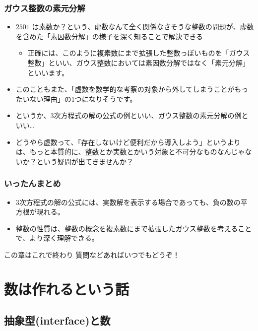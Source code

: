 \documentclass[dvipdfmx]{beamer}
\begin{document}
  \begin{frame}
    \frametitle{ガウス整数の素元分解}
  
    \begin{itemize}
      \item $2501$ は素数か？という、虚数なんて全く関係なさそうな整数の問題が、虚数を含めた「素因数分解」の様子を深く知ることで解決できる
      \begin{itemize}
        \item 正確には、このように複素数にまで拡張した整数っぽいものを「ガウス整数」といい、ガウス整数においては素因数分解ではなく「素元分解」といいます。
      \end{itemize}
      \item このこともまた、「虚数を数学的な考察の対象から外してしまうことがもったいない理由」の1つになりそうです。
      \pause
      \item というか、3次方程式の解の公式の例といい、ガウス整数の素元分解の例といい…
      \item どうやら虚数って、「存在しないけど便利だから導入しよう」というよりは、もっと本質的に、整数とか実数とかいう対象と不可分なものなんじゃないか？という疑問が出てきませんか？
    \end{itemize}
  
  \end{frame}
  
  \begin{frame}
    \frametitle{いったんまとめ}
  
    \begin{itemize}
      \item 3次方程式の解の公式には、実数解を表示する場合であっても、負の数の平方根が現れる。
      \item 整数の性質は、整数の概念を複素数にまで拡張したガウス整数を考えることで、より深く理解できる。
    \end{itemize}

    \begin{block}{この章はこれで終わり}
      質問などあればいつでもどうぞ！
    \end{block}
  
  \end{frame}

  \section{数は作れるという話}

  \subsection{抽象型(interface)と数}
\end{document}
